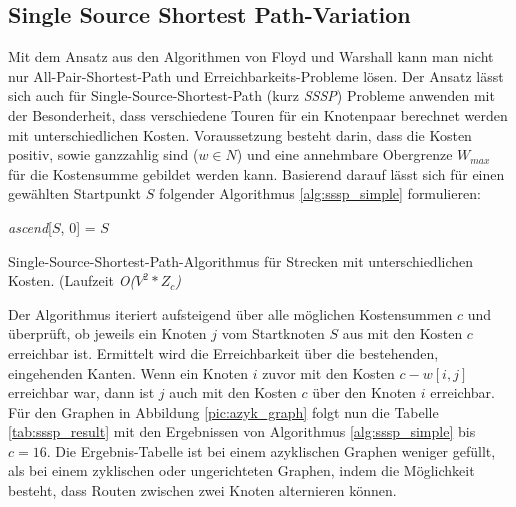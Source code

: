 \documentclass[12pt]{article}
\begin{document}
\subsection{Single Source Shortest Path-Variation}\label{sssp_chapter}

Mit dem Ansatz aus den Algorithmen von Floyd und Warshall kann man nicht nur All-Pair-Shortest-Path und Erreichbarkeits-Probleme lösen. Der Ansatz lässt sich auch für Single-Source-Shortest-Path (kurz \textit{SSSP}) Probleme anwenden mit der Besonderheit, dass verschiedene Touren für ein Knotenpaar berechnet werden mit unterschiedlichen Kosten. Voraussetzung besteht darin, dass die Kosten  positiv, sowie ganzzahlig sind ($w \in N$) und eine annehmbare Obergrenze $W_{max}$ für die Kostensumme gebildet werden kann. Basierend darauf lässt sich für einen gewählten Startpunkt $S$ folgender Algorithmus \ref{alg:sssp_simple} formulieren:

\begin{algorithm}
\textit{ascend}[$S$, 0] = $S$ \;
\caption{Single-Source-Shortest-Path-Algorithmus für Strecken mit unterschiedlichen Kosten. (Laufzeit \textit{O($V^2*Z_c$)}}
\label{alg:sssp_simple}
\end{algorithm}

Der Algorithmus iteriert aufsteigend über alle möglichen Kostensummen $c$ und überprüft, ob jeweils ein Knoten $j$ vom Startknoten $S$ aus mit den Kosten $c$ erreichbar ist. Ermittelt wird die Erreichbarkeit über die bestehenden, eingehenden Kanten. Wenn ein Knoten $i$ zuvor mit den Kosten $c - w[i,j]$ erreichbar war, dann ist $j$ auch mit den Kosten $c$ über den Knoten $i$ erreichbar. Für den Graphen in Abbildung \ref{pic:azyk_graph} folgt nun die Tabelle \ref{tab:sssp_result} mit den Ergebnissen von Algorithmus \ref{alg:sssp_simple} bis $c = 16$.  Die Ergebnis-Tabelle ist bei einem azyklischen Graphen weniger gefüllt, als bei einem zyklischen oder ungerichteten Graphen, indem die Möglichkeit besteht, dass Routen zwischen zwei Knoten alternieren können.
\end{document}

